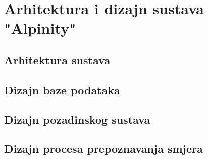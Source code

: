 \chapter{Arhitektura i dizajn sustava "Alpinity"}

\section{Arhitektura sustava}

\section{Dizajn baze podataka}

\section{Dizajn pozadinskog sustava}

\section{Dizajn procesa prepoznavanja smjera}
